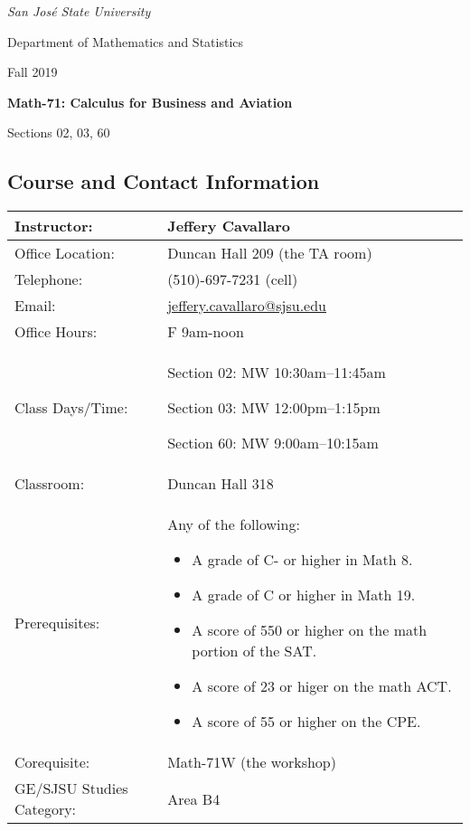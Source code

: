 \documentclass[letterpaper,12pt,fleqn]{article}
\begin{document}
\begin{center}
  \emph{San Jos\'{e} State University}

  Department of Mathematics and Statistics

  {\large Fall 2019}
  
  \begin{Large}
    \bfseries
    Math-71: Calculus for Business and Aviation

    Sections 02, 03, 60
  \end{Large}
\end{center}

\vspace{0.25in}

\subsection*{Course and Contact Information}

\begin{tabular}{|p{2in}|p{4.5in}|}
  \hline
  Instructor: & Jeffery Cavallaro \\
  \hline
  Office Location: & Duncan Hall 209 (the TA room) \\
  \hline
  Telephone: & (510)-697-7231 (cell) \\
  \hline
  Email: & \url{jeffery.cavallaro@sjsu.edu} \\
  \hline
  Office Hours: & F 9am-noon \\
  \hline
  Class Days/Time: & \begin{minipage}{4.5in}
    \vspace{0.1cm}
    Section 02: MW 10:30am--11:45am
    
    Section 03: MW 12:00pm--1:15pm
    
    Section 60: MW 9:00am--10:15am
    \vspace{0.1cm}
  \end{minipage} \\
  \hline
  Classroom: & Duncan Hall 318 \\
  \hline
  Prerequisites: & \begin{minipage}{4.5in}
    \vspace{0.1cm}
    Any of the following:
    \begin{itemize}
    \item A grade of C- or higher in Math 8.
    \item A grade of C or higher in Math 19.
    \item A score of 550 or higher on the math portion of the SAT.
    \item A score of 23 or higer on the math ACT.
    \item A score of 55 or higher on the CPE.
    \end{itemize}
    \vspace{0.1cm}
  \end{minipage} \\
  \hline
  Corequisite: & Math-71W (the workshop) \\
  \hline
  GE/SJSU Studies Category: & Area B4 \\
  \hline
\end{tabular}
\end{document}
